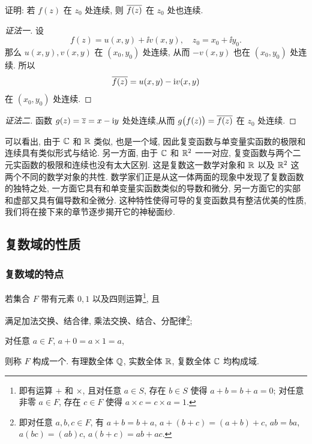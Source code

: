 \begin{example}
  证明: 若 $f(z)$ 在 $z_0$ 处连续, 则 $\overline{f(z)}$ 在 $z_0$ 处也连续.
\end{example}

\begin{proof}[证法一]
  设
  \[
    f(z)=u(x,y)+\ii v(x,y),\quad
    z_0=x_0+\ii y_0.
  \]
  那么 $u(x,y),v(x,y)$ 在 $(x_0,y_0)$ 处连续, 从而 $-v(x,y)$ 也在 $(x_0,y_0)$ 处连续.
  所以
  \[
    \overline{f(z)}=u(x,y)-\mathrm{i} v(x,y)
  \]
  在 $(x_0,y_0)$ 处连续.
\end{proof}

\begin{proof}[证法二]
  函数 $g(z)=\overline z=x-\mathrm{i} y$ 处处连续,从而 $g\bigl(f(z)\bigr)=\overline{f(z)}$ 在 $z_0$ 处连续.
\end{proof}

可以看出, 由于 ${\mathbb{C}}$ 和 ${\mathbb{R}}$ 类似, 也是一个域, 因此复变函数与单变量实函数的极限和连续具有类似形式与结论.
另一方面, 由于 ${\mathbb{C}}$ 和 ${\mathbb{R}}^2$ 一一对应, 复变函数与两个二元实函数的极限和连续也没有太大区别.
这是复数这一数学对象和 ${\mathbb{R}}$ 以及 ${\mathbb{R}}^2$ 这两个不同的数学对象的共性.
数学家们正是从这一体两面的现象中发现了复数函数的独特之处, 一方面它具有和单变量实函数类似的导数和微分, 另一方面它的实部和虚部又具有偏导数和全微分.
这种特性使得可导的复变函数具有整洁优美的性质, 我们将在接下来的章节逐步揭开它的神秘面纱.


\subsection{复数域的性质\optional}
\label{ssec:complex-field}

\subsubsection{复数域的特点}

若集合 $F$ 带有元素 $0,1$ 以及四则运算\footnote{%
  即有运算 $+$ 和 $\times$, 且对任意 $a\in S$, 存在 $b\in S$ 使得 $a+b=b+a=0$; 对任意非零 $a\in F$, 存在 $c\in F$ 使得 $a\times c=c\times a=1$.%
}, 且
\begin{enuma}
  \item 满足加法交换、结合律, 乘法交换、结合、分配律\footnote{即对任意 $a,b,c\in F$, 有 $a+b=b+a$, $a+(b+c)=(a+b)+c$, $ab=ba$, $a(bc)=(ab)c$, $a(b+c)=ab+ac$.};
  \item 对任意 $a\in F$, $a+0=a\times 1=a$,
\end{enuma}\parnoindent
则称 $F$ 构成一个.
有理数全体 ${\mathbb{Q}}$, 实数全体 ${\mathbb{R}}$, 复数全体 ${\mathbb{C}}$ 均构成域.

